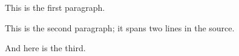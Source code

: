 This is the first paragraph.

This is the second paragraph; it spans
two lines in the source.

And here is the third.
